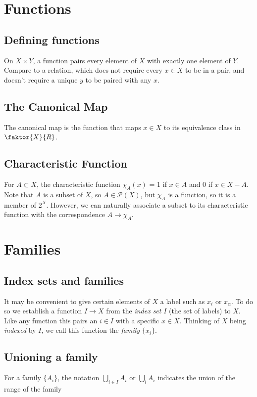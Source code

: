 \documentclass{article}
\begin{document}
\section{Functions}

\subsection{Defining functions} 

On $X \times Y$, a function pairs every element of $X$ with exactly one element of $Y$. Compare to a relation, which does not require every $x \in X$ to be in a pair, and doesn't require a unique $y$ to be paired with any $x$.

\subsection{The Canonical Map} The canonical map is the function that maps $x \in X$ to its equivalence class in $\faktor{X}{R}$.

\subsection{Characteristic Function} For $A \subset X$, the characteristic function $\chi_A(x)$ = 1 if $x \in A$ and 0 if $x \in X - A$. Note that $A$ is a subset of $X$, so $A \in \mathscr{P}(X)$, but $\chi_A$ is a function, so it is a member of $2^X$. However, we can naturally associate a subset to its characteristic function with the correspondence $A \longrightarrow \chi_A$.

\section{Families}

\subsection{Index sets and families} It may be convenient to give certain elements of $X$ a label such as $x_i$ or $x_\alpha$. To do so we establish a function $I \longrightarrow X$ from the \textit{index set} $I$ (the set of labels) to $X$. Like any function this pairs an $i \in I$ with a specific $x \in X$. Thinking of $X$ being \textit{indexed} by $I$, we call this function the \textit{family} $\{x_i\}$.

\subsection{Unioning a family} For a family $\{A_i\}$, the notation $\bigcup_{i \in I} A_i$ or $\bigcup_i A_i$ indicates the union of the range of the family
\end{document}

